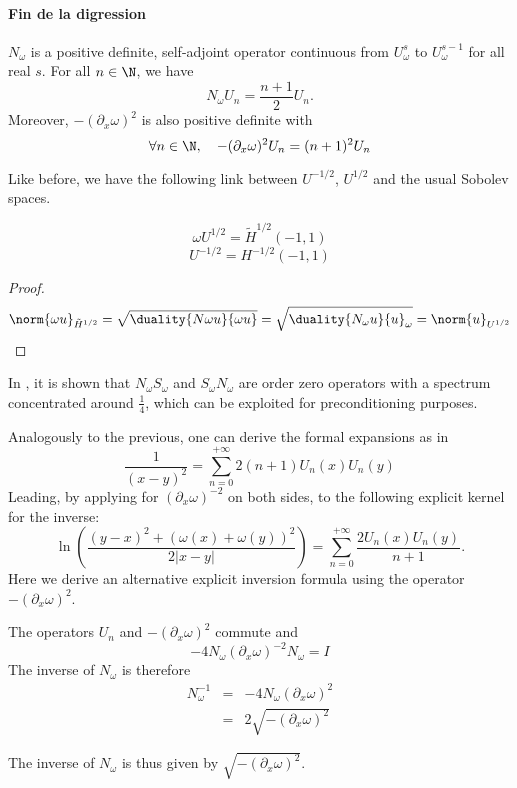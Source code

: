 \documentclass[]{article}
\begin{document}
\paragraph{Fin de la digression}


\begin{Prop}
	$N_\omega$ is a positive definite, self-adjoint operator continuous from $U^s_\omega$ to $U^{s-1}_\omega$ for all real $s$. For all $n \in \N$, we have 
	\[N_\omega U_n = \frac{n+1}{2}U_n.\]
	Moreover, $-(\partial_x\omega)^2$ is also positive definite with
	\[\forall n \in \N,\quad  -(\partial_x \omega)^2 U_n = (n+1)^2 U_n\]
	\label{NUn}
\end{Prop}

Like before, we have the following link between $U^{-1/2}$, $U^{1/2}$ and the usual Sobolev spaces. 

\begin{Prop}
	\[\omega U^{1/2} = \tilde{H}^{1/2}(-1,1)\]
	\[ U^{-1/2} = H^{-1/2}(-1,1)\]
	\begin{proof}
		\[ \norm{\omega u}_{\tilde{H}^{1/2}} = \sqrt{\duality{N\omega u}{\omega u}} = \sqrt{\duality{N_\omega u}{u}_\omega} = \norm{u}_{U^{1/2}}\]
	\end{proof}
	
\end{Prop}

In \cite{bruno2012second}, it is shown that $N_\omega S_\omega$ and $S_\omega N_\omega$ are order zero operators with a spectrum concentrated around $\frac{1}{4}$, which can be exploited for preconditioning purposes. 


Analogously to the previous, one can derive the formal expansions as in \cite{jerez2012explicit}
\[\frac{1}{(x-y)^2} = \sum_{n=0}^{+\infty} 2(n+1)U_n(x)U_n(y)\]
Leading, by applying for $(\partial_x\omega)^{-2}$ on both sides, to the following explicit kernel for the inverse:
\[\ln\left(\dfrac{(y-x)^2 + (\omega(x) + \omega(y))^2}{2|x-y|}\right) = \sum_{n=0}^{+\infty} \dfrac{2 U_n(x) U_n(y)}{n+1}.\]
Here we derive an alternative explicit inversion formula using the operator $-(\partial_x \omega)^2$.
\begin{The} The operators $U_n$ and $-(\partial_x \omega)^2$ commute and 
\[-4 N_\omega (\partial_x \omega)^{-2} N_{\omega} = I\]
The inverse of $N_\omega$ is therefore 
\begin{eqnarray*}
	N_\omega^{-1} &=& - 4 N_\omega (\partial_x \omega)^2\\
	&=& 2\sqrt{-(\partial_x \omega)^2}
\end{eqnarray*}
\end{The}
The inverse of $N_\omega$ is thus given by $\sqrt{-(\partial_x \omega)^2 }$. 
\end{document}
